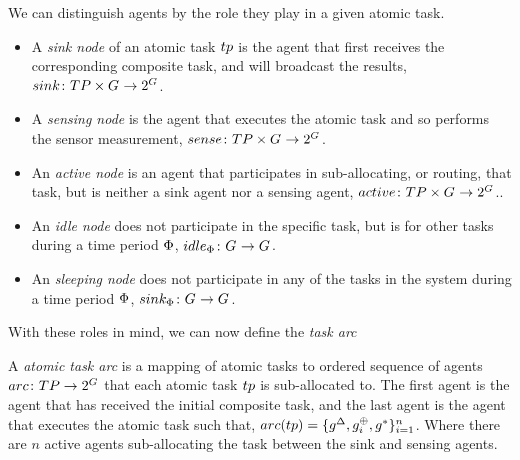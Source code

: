 We can distinguish agents by the role they play in a given atomic task.
\begin{itemize}
	\item A \textit{sink node} of an atomic task $\varAtomicTask{}{}$ is the agent that first receives the corresponding composite task, and will broadcast the results, $\formalSinkRole{}{}$.
	\item A \textit{sensing node} is the agent that executes the atomic task and so performs the sensor measurement, $\formalSenseRole{}{}$.
	\item An \textit{active node} is an agent that participates in sub-allocating, or routing, that task, but is neither a sink agent nor a sensing agent, $\formalActiveRole{}{}$..
	\item An \textit{idle node} does not participate in the specific task, but is for other tasks during a time period $\Phi$, $\formalIdleRole{}{}$.
	\item An \textit{sleeping node} does not participate in any of the tasks in the system during a time period $\Phi$, $\formalSleepRole{}{}$.
\end{itemize}

With these roles in mind, we can now define the \textit{task arc}

\begin{definition}
	A \textit{atomic task arc} is a mapping of atomic tasks to ordered sequence of agents $\formalTaskArc{}{}$ that each atomic task $\varAtomicTask{}{}$ is sub-allocated to. The first agent is the agent that has received the initial composite task, and the last agent is the agent that executes the atomic task such that, 
	$\functionTaskArc{}{} = \lbrace \varSinkAgent{}{}, \varActiveAgent{i}{}, \varSensingAgent{}{} \rbrace_{i=1}^{n}$. Where there are $n$ active agents sub-allocating the task between the sink and sensing agents.
\end{definition}


